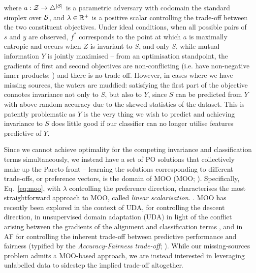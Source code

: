 %
where \( a: {\mathcal{Z}} \to \bigtriangleup^{|{\mathcal{S}}|} \) is a parametric adversary with codomain the standard
simplex over \( {\mathcal{S}} \), and \(\lambda \in \mathbb{R}^+\) is a positive scalar controlling the trade-off
between the two constituent objectives. 
%
Under ideal conditions, when all possible pairs of \(s\) and \(y\) are observed, \(f^\ast\)
corresponds to the point at which \(a\) is maximally entropic and occurs when \(Z\) is invariant to
\(S\), and only \(S\), while mutual information \wrt{} \(Y\) is jointly maximised -- from an
optimisation standpoint, the gradients of first and second objectives are non-conflicting (i.e.
have non-negative inner products; \cite{yu2020gradient}) and there is no trade-off. 
%
However, in cases where we have missing sources, the waters are muddied: satisfying the first part
of the objective connotes invariance not only to \(S\), but also to \(Y\), since \(S\) can be
predicted from \(Y\) with above-random accuracy due to the skewed statistics of the dataset. 
%
This is patently problematic as \(Y\) is the very thing we wish to predict and achieving invariance
to \(S\) does little good if our classifier can no longer utilise features predictive of \(Y\). 

Since we cannot achieve optimality for the competing invariance and classification terms
simultaneously, we instead have a set of \ac{PO} solutions that collectively make up the Pareto
front -- learning the solutions corresponding to different trade-offs, or preference vectors, is
the domain of \acl{MOO} (\acs{MOO}; \citealp{deb2014multi}). 
%
Specifically, Eq.~\ref{eq:moo}, with \(\lambda\) controlling the preference direction,
characterises the most straightforward approach to MOO, called \emph{linear scalarisation}.
\citep{boyd2004convex}. 
%
\Ac{MOO} has recently been explored in the context of \ac{UDA}, for controlling the descent
direction, in unsupervised domain adaptation (UDA) in light of the conflict arising between the
gradients of the alignment and classification terms \citep{liang2021pareto}, and in \acf{AF} for
controlling the inherent trade-off between predictive performance and fairness (typified by the
\emph{Accuracy-Fairness trade-off}; \citet{martinez2020minimax}).
%
While our missing-sources problem admits a \acs{MOO}-based approach, we are instead interested in
leveraging unlabelled data to sidestep the implied trade-off altogether.
